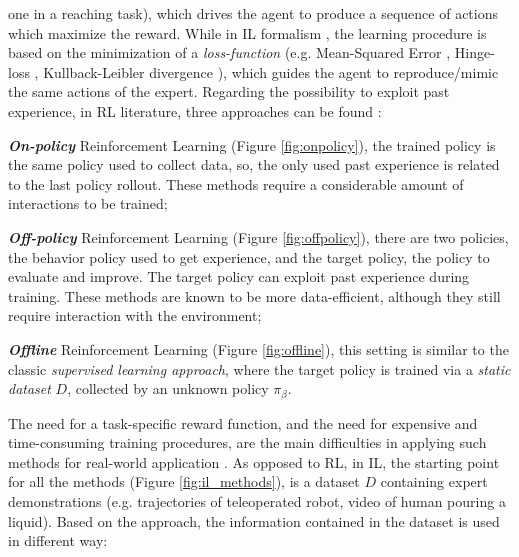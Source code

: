 one in a reaching task), which drives the agent to produce a sequence of actions which maximize the reward.
While in IL formalism \cite{osa2018algorithmic}, the learning procedure is based on the minimization of a
\textit{loss-function} (e.g. Mean-Squared Error \cite{james2013introduction_to_sl}, Hinge-loss \cite{cortes1995support},
Kullback-Leibler divergence \cite{kullback1951information}), which guides the agent to reproduce/mimic the same actions
of the expert. \newline Regarding the possibility to exploit past experience, in RL literature, three approaches can be
found \cite{levine202rl_tutorial}:
\begin{itemize*}
    \item \textbf{\textit{On-policy}} Reinforcement Learning (Figure \ref{fig:onpolicy}), the trained policy is the same
    policy used to collect data, so, the only used past experience is related to the last policy rollout. These methods
    require a considerable amount of interactions to be trained;
    \item \textbf{\textit{Off-policy}} Reinforcement Learning (Figure \ref{fig:offpolicy}), there are two policies, the
    behavior policy used to get experience, and the target policy, the policy to evaluate and improve. The target policy
    can exploit past experience during training. These methods are known to be more data-efficient, although
    they still require interaction with the environment;
    \item \textbf{\textit{Offline}} Reinforcement Learning (Figure \ref{fig:offline}), this setting is similar to the
    classic \textit{supervised learning approach}, where the target policy is trained via a \textit{static dataset} $D$,
    collected by an unknown policy $\pi_{\beta}$.  
\end{itemize*}

\noindent The need for a task-specific reward function, and the need for expensive and time-consuming training
procedures, are the main difficulties in applying such methods for real-world application
\cite{hussein2017imitation_learning_survey}. \newline As opposed to RL, in IL, the starting point for all the methods
(Figure \ref{fig:il_methods}), is a dataset $D$ containing expert demonstrations (e.g. trajectories of teleoperated
robot, video of human pouring a liquid). Based on the approach, the information contained in the dataset
is used in different way:
